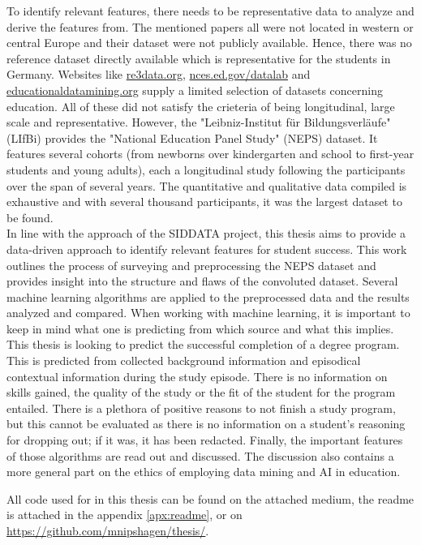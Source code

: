 To identify relevant features, there needs to be representative data to analyze and derive the features from. The mentioned papers all were not located in western or central Europe and their dataset were not publicly available. Hence, there was no reference dataset directly available which is representative for the students in Germany. Websites like \href{https://www.re3data.org/}{re3data.org}, \href{https://nces.ed.gov/datalab/index.aspx}{nces.ed.gov/datalab} and \href{http://educationaldatamining.org/}{educationaldatamining.org} supply a limited selection of datasets concerning education. All of these did not satisfy the crieteria of being longitudinal, large scale and representative. However, the "Leibniz-Institut für Bildungsverläufe" (LIfBi) provides the "National Education Panel Study" (NEPS) dataset\cite{Weinert.}. It features several cohorts (from newborns over kindergarten and school to first-year students and young adults), each a longitudinal study following the participants over the span of several years. The quantitative and qualitative data compiled is exhaustive and with several thousand participants, it was the largest dataset to be found.\\

In line with the approach of the SIDDATA project, this thesis aims to provide a data-driven approach to identify relevant features for student success. This work outlines the process of surveying and preprocessing the NEPS dataset and provides insight into the structure and flaws of the convoluted dataset. Several machine learning algorithms are applied to the preprocessed data and the results analyzed and compared. When working with machine learning, it is important to keep in mind what one is predicting from which source and what this implies. This thesis is looking to predict the successful completion of a degree program. This is predicted from collected background information and episodical contextual information during the study episode. There is no information on skills gained, the quality of the study or the fit of the student for the program entailed. There is a plethora of positive reasons to not finish a study program, but this cannot be evaluated as there is no information on a student's reasoning for dropping out; if it was, it has been redacted. Finally, the important features of those algorithms are read out and discussed. The discussion also contains a more general part on the ethics of employing data mining and AI in education.

All code used for in this thesis can be found on the attached medium, the readme is attached in the appendix \ref{apx:readme}, or on \url{https://github.com/mnipshagen/thesis/}.